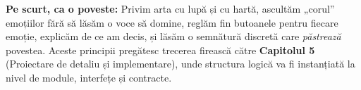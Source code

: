 \noindent\textbf{Pe scurt, ca o poveste:} Privim arta cu lupă și cu hartă, ascultăm „corul” emoțiilor fără să lăsăm o voce să domine, reglăm fin butoanele pentru fiecare emoție, explicăm de ce am decis, și lăsăm o semnătură discretă care \emph{păstrează} povestea. Aceste principii pregătesc trecerea firească către \textbf{Capitolul 5} (Proiectare de detaliu și implementare), unde structura logică va fi instanțiată la nivel de module, interfețe și contracte.